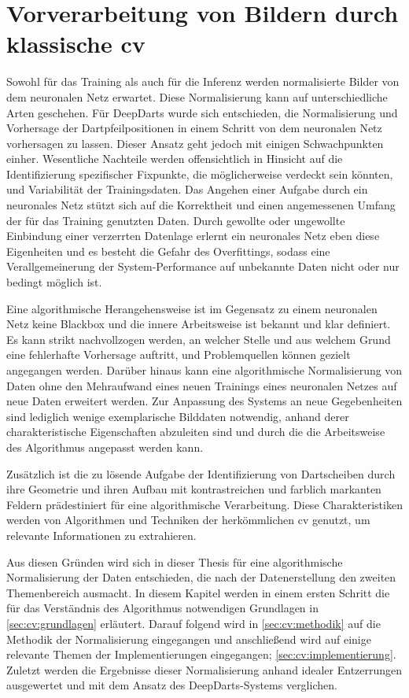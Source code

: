 
\chapter{Vorverarbeitung von Bildern durch klassische \acl{cv}}
\label{cha:cv}

Sowohl für das Training als auch für die Inferenz werden normalisierte Bilder von dem neuronalen Netz erwartet. Diese Normalisierung kann auf unterschiedliche Arten geschehen. Für DeepDarts wurde sich entschieden, die Normalisierung und Vorhersage der Dartpfeilpositionen in einem Schritt von dem neuronalen Netz vorhersagen zu lassen. Dieser Ansatz geht jedoch mit einigen Schwachpunkten einher. Wesentliche Nachteile werden offensichtlich in Hinsicht auf die Identifizierung spezifischer Fixpunkte, die möglicherweise verdeckt sein könnten, und Variabilität der Trainingsdaten. Das Angehen einer Aufgabe durch ein neuronales Netz stützt sich auf die Korrektheit und einen angemessenen Umfang der für das Training genutzten Daten. Durch gewollte oder ungewollte Einbindung einer verzerrten Datenlage erlernt ein neuronales Netz eben diese Eigenheiten und es besteht die Gefahr des Overfittings, sodass eine Verallgemeinerung der System-Performance auf unbekannte Daten nicht oder nur bedingt möglich ist.

Eine algorithmische Herangehensweise ist im Gegensatz zu einem neuronalen Netz keine Blackbox und die innere Arbeitsweise ist bekannt und klar definiert. Es kann strikt nachvollzogen werden, an welcher Stelle und aus welchem Grund eine fehlerhafte Vorhersage auftritt, und Problemquellen können gezielt angegangen werden. Darüber hinaus kann eine algorithmische Normalisierung von Daten ohne den Mehraufwand eines neuen Trainings eines neuronalen Netzes auf neue Daten erweitert werden. Zur Anpassung des Systems an neue Gegebenheiten sind lediglich wenige exemplarische Bilddaten notwendig, anhand derer charakteristische Eigenschaften abzuleiten sind und durch die die Arbeitsweise des Algorithmus angepasst werden kann.

Zusätzlich ist die zu lösende Aufgabe der Identifizierung von Dartscheiben durch ihre Geometrie und ihren Aufbau mit kontrastreichen und farblich markanten Feldern prädestiniert für eine algorithmische Verarbeitung. Diese Charakteristiken werden von Algorithmen und Techniken der herkömmlichen \ac{cv} genutzt, um relevante Informationen zu extrahieren.

Aus diesen Gründen wird sich in dieser Thesis für eine algorithmische Normalisierung der Daten entschieden, die nach der Datenerstellung den zweiten Themenbereich ausmacht. In diesem Kapitel werden in einem ersten Schritt die für das Verständnis des Algorithmus notwendigen Grundlagen in \autoref{sec:cv:grundlagen} erläutert. Darauf folgend wird in \autoref{sec:cv:methodik} auf die Methodik der Normalisierung eingegangen und anschließend wird auf einige relevante Themen der Implementierungen eingegangen; \autoref{sec:cv:implementierung}. Zuletzt werden die Ergebnisse dieser Normalisierung anhand idealer Entzerrungen ausgewertet und mit dem Ansatz des DeepDarts-Systems verglichen.






